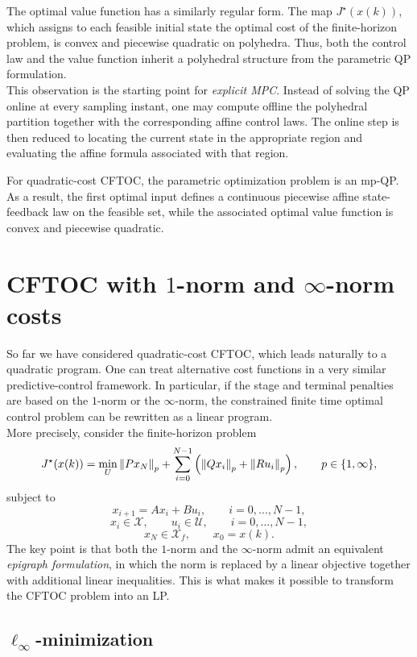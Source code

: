The optimal value function has a similarly regular form. The map \(J^\star(x(k))\), which
assigns to each feasible initial state the optimal cost of the finite-horizon problem, is convex
and piecewise quadratic on polyhedra. Thus, both the control law and the value function inherit
a polyhedral structure from the parametric QP formulation.\\
This observation is the starting point for \emph{explicit MPC}. Instead of solving the QP online
at every sampling instant, one may compute offline the polyhedral partition together with the
corresponding affine control laws. The online step is then reduced to locating the current state
in the appropriate region and evaluating the affine formula associated with that region.

\begin{theorembox}
For quadratic-cost CFTOC, the parametric optimization problem is an mp-QP. As a result, the
first optimal input defines a continuous piecewise affine state-feedback law on the feasible set,
while the associated optimal value function is convex and piecewise quadratic.
\end{theorembox}
\section{CFTOC with \(1\)-norm and \(\infty\)-norm costs}

So far we have considered quadratic-cost CFTOC, which leads naturally to a quadratic
program. One can treat alternative cost functions in a very similar
predictive-control framework. In particular, if the stage and terminal penalties are based on the
\(1\)-norm or the \(\infty\)-norm, the constrained finite time optimal control problem can be
rewritten as a linear program.\\
More precisely, consider the finite-horizon problem
\[
J^\star(x(k))
=
\min_U
\left\lVert Px_N \right\rVert_p+\sum_{i=0}^{N-1}\left(\left\lVert Qx_i \right\rVert_p+\left\lVert Ru_i \right\rVert_p\right),
\qquad p\in\{1,\infty\},
\]
subject to
\[
x_{i+1}=Ax_i+Bu_i,\qquad i=0,\dots,N-1,
\]
\[
x_i\in\mathcal X,\qquad u_i\in\mathcal U,\qquad i=0,\dots,N-1,
\]
\[
x_N\in\mathcal X_f,
\qquad
x_0=x(k).
\]
The key point is that both the \(1\)-norm and the \(\infty\)-norm admit an equivalent
\emph{epigraph formulation}, in which the norm is replaced by a linear objective together with
additional linear inequalities. This is what makes it possible to transform the CFTOC problem
into an LP.

\subsection{\(\ell_\infty\)-minimization}

